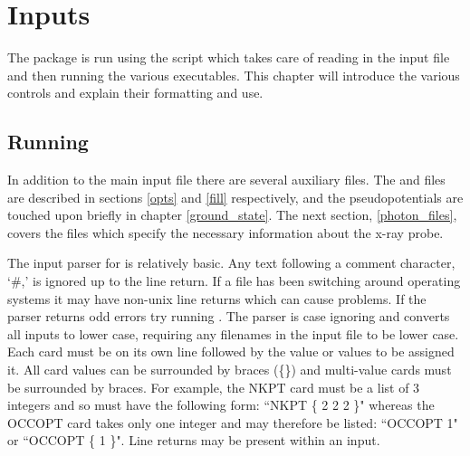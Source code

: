 \documentclass[11pt]{report}
\begin{document}
\chapter{Inputs}

The  package is run using the  script  which takes care of reading in the input file and then running the various executables. This chapter will introduce the various controls and explain their formatting and use.


\section{Running \OCEAN}

In addition to the main input file there are several auxiliary files. The  and  files are described in sections \ref{opts}  and \ref{fill} respectively, and the pseudopotentials are touched upon briefly in chapter \ref{ground_state}. The next section, \ref{photon_files}, covers the  files which specify the necessary information about the x-ray probe. 

The input parser for  is relatively basic. Any text following a comment character, `\#,' is ignored up to the line return. If a file has been switching around operating systems it may have non-unix line returns which can cause problems. If the parser returns odd errors try running . The parser is case ignoring and converts all inputs to lower case, requiring any filenames in the input file to be lower case. Each card must be on its own line followed by the value or values to be assigned it. All card values can be surrounded by braces (\{\}) and multi-value cards must be surrounded by braces. For example, the NKPT card must be a list of 3 integers and so must have the following form: ``NKPT \{ 2 2 2 \}" whereas the OCCOPT card takes only one integer and may therefore be listed: ``OCCOPT 1" or ``OCCOPT \{ 1 \}". Line returns may be present within an input. 
\end{document}
